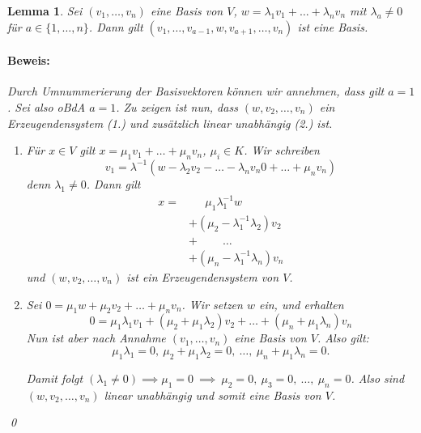 \documentclass{report}
\newcommand{\lb}{\lambda}
\theoremstyle{customrem}
\theoremstyle{customdef}
\newtheorem{lemma}[definition]{Lemma}
\renewenvironment{proof}{\paragraph{Beweis: }}{\qed}
\theoremstyle{customenv}
\begin{document}
	\begin{lemma}
		\label{lem214}
		Sei \((v_1, \dots, v_n)\) eine Basis von \(V\), \(w = \lb_1v_1 + \dots +  \lb_n v_n\) mit \(\lb_a \neq 0\) für \(a \in \{1, \dots, n\}\). Dann gilt \((v_1, \dots, v_{a - 1}, w, v_{a+1}, \dots, v_n)\) ist eine Basis.

		\begin{proof}
			Durch Umnummerierung der Basisvektoren können wir annehmen, dass gilt \(a = 1\). Sei also oBdA \(a = 1\). Zu zeigen ist nun, dass \((w, v_2, \dots, v_n)\) ein Erzeugendensystem (1.) und zusätzlich linear unabhängig (2.) ist.
			\begin{enumerate}
				\item Für \(x \in V\) gilt \(x = \mu_1 v_1 + \ldots + \mu_n v_n\), \(\mu_i \in K\). Wir schreiben
				\[v_1 = \lb^{-1}(w-\lb_2 v_2 - \ldots - \lb_n v_n0 + \ldots + \mu_n v_n)\] denn \(\lb_1\not=0\). Dann gilt
				\begin{align*}
				x =&\quad \ \ \mu_1\lb_1^{-1}w\\
				&+(\mu_2-\lb_1^{-1}\lb_2)v_2\\
				&+\qquad\ \ldots\\
				&+(\mu_n-\lb_1^{-1}\lb_n)v_n
				\end{align*}
				und \((w, v_2, \dots, v_n)\) ist ein Erzeugendensystem von \(V\).
				\item Sei \(0 = \mu_1 w + \mu_2 v_2 + \ldots + \mu_n v_n\). Wir setzen \(w\) ein, und erhalten
				\[0 = \mu_1 \lb_1 v_1 + (\mu_2  + \mu_1 \lb_2) v_2 + \ldots + (\mu_n + \mu_1 \lb_n)v_n\]
				Nun ist aber nach Annahme \((v_1, \ldots, v_n)\) eine Basis von \(V\). Also gilt: \[\mu_1\lb_1 = 0,\ \mu_2  + \mu_1 \lb_2=0,\ \ldots ,\ \mu_n + \mu_1 \lb_n = 0.\]

				Damit folgt \((\lb_1 \neq 0) \implies \mu_1 = 0\ \implies \ \mu_2=0,\ \mu_3=0,\ \ldots ,\ \mu_n=0\). Also sind \((w, v_2, \dots, v_n)\) linear unabhängig und somit eine Basis von \(V\).
			\end{enumerate}
		\end{proof}
	\end{lemma}
\end{document}
